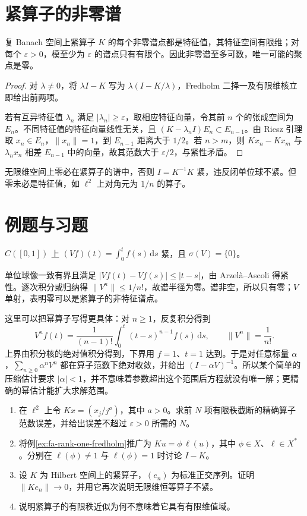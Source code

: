 \section{紧算子的非零谱}
\begin{theorem}\label{thm:fa-compact-spectrum}
复 Banach 空间上紧算子 $K$ 的每个非零谱点都是特征值，其特征空间有限维；对每个 $\varepsilon>0$，模至少为 $\varepsilon$ 的谱点只有有限个。因此非零谱至多可数，唯一可能的聚点是零。
\end{theorem}
\begin{proof}
对 $\lambda\ne0$，将 $\lambda I-K$ 写为 $\lambda(I-K/\lambda)$，Fredholm 二择一及有限维核立即给出前两项。

若有互异特征值 $\lambda_n$ 满足 $|\lambda_n|\geq\varepsilon$，取相应特征向量，令其前 $n$ 个的张成空间为 $E_n$。不同特征值的特征向量线性无关，且 $(K-\lambda_n I)E_n\subset E_{n-1}$。由 Riesz 引理取 $x_n\in E_n$，$\|x_n\|=1$，到 $E_{n-1}$ 距离大于 $1/2$。若 $n>m$，则 $Kx_n-Kx_m$ 与 $\lambda_nx_n$ 相差 $E_{n-1}$ 中的向量，故其范数大于 $\varepsilon/2$，与紧性矛盾。
\end{proof}
无限维空间上零必在紧算子的谱中，否则 $I=K^{-1}K$ 紧，违反闭单位球不紧。但零未必是特征值，如 $\ell^2$ 上对角元为 $1/n$ 的算子。

\section{例题与习题}
\begin{example}[Volterra 算子]
$C([0,1])$ 上 $(Vf)(t)=\int_0^t f(s)\,\mathrm ds$ 紧，且 $\sigma(V)=\{0\}$。
\end{example}
\begin{solve}
单位球像一致有界且满足 $|Vf(t)-Vf(s)|\leq|t-s|$，由 Arzelà--Ascoli 得紧性。逐次积分或归纳得 $\|V^n\|\leq1/n!$，故谱半径为零。谱非空，所以只有零；$V$ 单射，表明零可以是紧算子的非特征谱点。
\end{solve}

这里可以把幂算子写得更具体：对 $n\geq1$，反复积分得到
\[
 V^nf(t)=\frac1{(n-1)!}\int_0^t(t-s)^{n-1}f(s)\,\mathrm ds,
 \qquad \|V^n\|=\frac1{n!}.
\]
上界由积分核的绝对值积分得到，下界用 $f=1$、$t=1$ 达到。于是对任意标量 $\alpha$，$\sum_{n\geq0}\alpha^nV^n$ 都在算子范数下绝对收敛，并给出 $(I-\alpha V)^{-1}$。所以某个简单的压缩估计要求 $|\alpha|<1$，并不意味着参数超出这个范围后方程就没有唯一解；更精确的幂估计能扩大求解范围。
\begin{enumerate}
 \item 在 $\ell^2$ 上令 $Kx=(x_j/j^a)$，其中 $a>0$。求前 $N$ 项有限秩截断的精确算子范数误差，并给出误差不超过 $\varepsilon>0$ 所需的 $N$。
 \item 将例\ref{ex:fa-rank-one-fredholm}推广为 $Ku=\phi\,\ell(u)$，其中 $\phi\in X$、$\ell\in X^*$。分别在 $\ell(\phi)\ne1$ 与 $\ell(\phi)=1$ 时讨论 $I-K$。
 \item 设 $K$ 为 Hilbert 空间上的紧算子，$(e_n)$ 为标准正交序列。证明 $\|Ke_n\|\to0$，并用它再次说明无限维恒等算子不紧。
 \item 说明紧算子的有限秩近似为何不意味着它具有有限维值域。
\end{enumerate}

